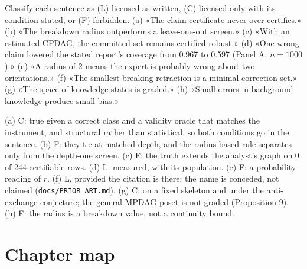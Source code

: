 \begin{exercicio}[metodo=classification,conceito=frases-proibidas]
Classify each sentence as (L) licensed as written, (C) licensed only with its condition stated, or (F)
forbidden. (a) «The claim certificate never over-certifies.» (b) «The breakdown radius outperforms a
leave-one-out screen.» (c) «With an estimated CPDAG, the committed set remains certified robust.» (d) «One
wrong claim lowered the stated report's coverage from 0.967 to 0.597 (Panel A, $n = 1000$).» (e) «A radius
of 2 means the expert is probably wrong about two orientations.» (f) «The smallest breaking retraction is a
minimal correction set.» (g) «The space of knowledge states is graded.» (h) «Small errors in background
knowledge produce small bias.»
\end{exercicio}
\begin{solucao}
(a) C: true given a correct class and a validity oracle that matches the instrument, and structural rather
than statistical, so both conditions go in the sentence. (b) F: they tie at matched depth, and the
radius-based rule separates only from the depth-one screen. (c) F: the truth extends the analyst's graph on
0 of 244 certifiable rows. (d) L: measured, with its population. (e) F: a probability reading of $r$.
(f) L, provided the citation is there: the name is conceded, not claimed (\texttt{docs/\allowbreak PRIOR\_ART.md}). (g) C: on a
fixed skeleton and under the anti-exchange conjecture; the general MPDAG poset is not graded (Proposition 9).
(h) F: the radius is a breakdown value, not a continuity bound.
\end{solucao}

\section*{Chapter map}
\begin{center}
\end{center}

